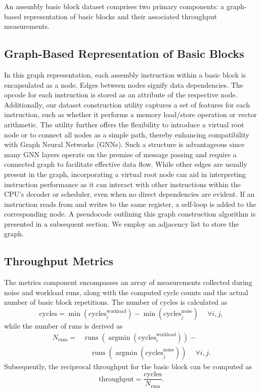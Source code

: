 An assembly basic block dataset comprises two primary components: a graph-based representation of 
basic blocks and their associated throughput measurements.

\subsection{Graph-Based Representation of Basic Blocks}

In this graph representation, each assembly instruction within a basic block is encapsulated as a 
node. Edges between nodes signify data dependencies. The opcode for each instruction is stored as 
an attribute of the respective node. Additionally, our dataset construction utility captures a set 
of features for each instruction, such as whether it performs a memory load/store operation or vector 
arithmetic. The utility further offers the flexibility to introduce a virtual root node or to connect 
all nodes as a simple path, thereby enhancing compatibility with Graph Neural Networks (GNNs). Such 
a structure is advantageous since many GNN layers operate on the premise of message passing and require 
a connected graph to facilitate effective data flow. While other edges are usually present in the graph, 
incorporating a virtual root node can aid in interpreting instruction performance as it can interact with 
other instructions within the CPU's decoder or scheduler, even when no direct dependencies are evident. 
If an instruction reads from and writes to the same register, a self-loop is added to the corresponding 
node. A pseudocode outlining this graph construction algorithm is presented in a subsequent section. 
We employ an adjacency list to store the graph.

\subsection{Throughput Metrics}

The metrics component encompasses an array of measurements collected during noise and workload runs, 
along with the computed cycle counts and the actual number of basic block repetitions. The number of 
cycles is calculated as
\[\mathrm{cycles} = \operatorname{min}(\mathrm{cycles}^{\mathrm{workload}}_i) - \operatorname{min}(\mathrm{cycles}^{\mathrm{noise}}_j) \quad ~\forall i, j,\] while the number of runs 
is derived as 
\begin{equation*}
\begin{split}
N_{\mathrm{runs}} = &\operatorname{runs}(\operatorname{argmin}(\mathrm{cycles}^{\mathrm{workload}}_i)) - \\
  &\quad \operatorname{runs}(\operatorname{argmin}(\mathrm{cycles}^{\mathrm{noise}}_j)) \quad ~\forall i, j.
\end{split}
\end{equation*}
Subsequently, the reciprocal throughput for the basic block can be computed as 
\[\mathrm{throughput} = \frac{\mathrm{cycles}}{N_{\mathrm{runs}}}.\]

